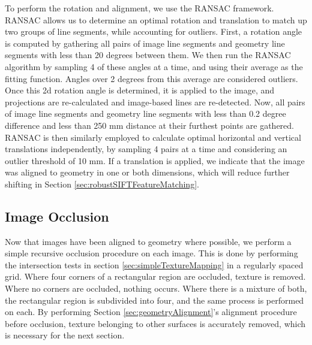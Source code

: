\documentclass[]{spie}  %
\begin{document}
{To perform the rotation and alignment, we use the RANSAC
\cite{fischler1981random} framework. RANSAC allows us to determine an
optimal rotation and translation to match up two groups of line
segments, while accounting for outliers. First, a rotation angle is
computed by gathering all pairs of image line segments and geometry
line segments with less than 20 degrees between them. We then run the
RANSAC algorithm by sampling 4 of these angles at a time, and using
their average as the fitting function. Angles over 2 degrees from this
average are considered outliers. Once this 2d rotation angle is
determined, it is applied to the image, and projections are
re-calculated and image-based lines are re-detected. Now, all pairs of
image line segments and geometry line segments with less than 0.2
degree difference and less than 250 mm distance at their furthest
points are gathered. RANSAC is then similarly employed to calculate
optimal horizontal and vertical translations independently, by
sampling 4 pairs at a time and considering an outlier threshold of 10
mm. If a translation is applied, we indicate that the image was
aligned to geometry in one or both dimensions, which will reduce
further shifting in Section \ref{sec:robustSIFTFeatureMatching}.

\subsection{Image Occlusion}
\label{sec:imageOcclusion}
Now that images have been aligned to geometry where possible, we
perform a simple recursive occlusion procedure on each image. This is
done by performing the intersection tests in section
\ref{sec:simpleTextureMapping} in a regularly spaced grid. Where four
corners of a rectangular region are occluded, texture is
removed. Where no corners are occluded, nothing occurs. Where there is
a mixture of both, the rectangular region is subdivided into four, and
the same process is performed on each. By performing Section
\ref{sec:geometryAlignment}'s alignment procedure before occlusion,
texture belonging to other surfaces is accurately removed, which is
necessary for the next section.

}
\end{document}
